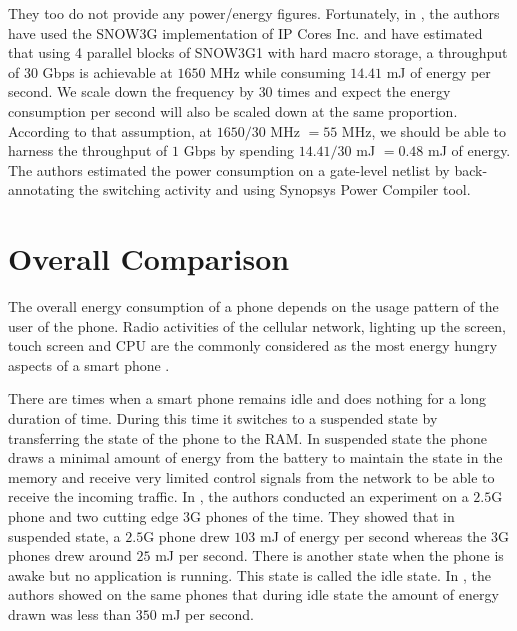 \documentclass[12pt]{llncs}
\begin{document}
They too do not provide any power/energy figures. Fortunately, in \cite{kolkata}, the authors have used the SNOW3G implementation of IP Cores Inc. and have estimated that using 4 parallel blocks of SNOW3G1 with hard macro storage, a throughput of 30 Gbps is achievable at $1650$ MHz while consuming $14.41$ mJ of energy per second. We scale down the frequency by $30$ times and expect the energy consumption per second will also be scaled down at the same proportion. According to that assumption, at $1650/30$ MHz $=55$ MHz, we should be able to harness the throughput of $1$ Gbps by spending $14.41/30$ mJ $=0.48$ mJ of energy. The authors estimated the power consumption on a gate-level netlist by back-annotating the switching activity and using Synopsys Power Compiler tool.

\section{Overall Comparison}
\label{sec:overall_comparison}
The overall energy consumption of a phone depends on the usage pattern of the user of the phone. Radio activities of the cellular network, lighting up the screen, touch screen and CPU are the commonly considered as the most energy hungry aspects of a smart phone \cite{Usenix_2010}. 

There are times when a smart phone remains idle and does nothing for a long duration of time. During this time it switches to a suspended state by transferring the state of the phone to the RAM. In suspended state the phone draws a minimal amount of energy from the battery to maintain the state in the memory and receive very limited control signals from the network to be able to receive the incoming traffic. In \cite{Usenix_2010}, the authors conducted an experiment on a $2.5$G phone and two cutting edge $3$G phones of the time. They showed that in suspended state, a $2.5$G phone drew $103$ mJ of energy per second whereas the 3G phones drew around $25$ mJ per second. There is another state when the phone is awake but no application is running. This state is called the idle state. In \cite{Usenix_2010}, the authors showed on the same phones that during idle state the amount of energy drawn was less than $350$ mJ per second. 
\end{document}

